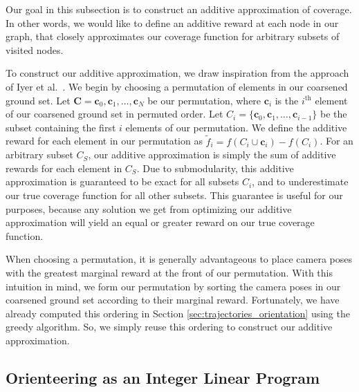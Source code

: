 Our goal in this subsection is to construct an additive approximation of coverage.
In other words, we would like to define an additive reward at each node in our graph, that closely approximates our coverage function for arbitrary subsets of visited nodes.

To construct our additive approximation, we draw inspiration from the approach of Iyer et al.~\cite{iyer:2013b,iyer:2013a}.
We begin by choosing a permutation of elements in our coarsened ground set.
Let $\mathbf{C} = \mathbf{c}_0, \mathbf{c}_1, \ldots, \mathbf{c}_N$ be our permutation, where $\mathbf{c}_i$ is the $i^{\text{th}}$ element of our coarsened ground set in permuted order.
Let $C_i = \{ \mathbf{c}_0, \mathbf{c}_1, \ldots, \mathbf{c}_{i-1} \}$ be the subset containing the first $i$ elements of our permutation.
We define the additive reward for each element in our permutation as $\tilde{f}_i = f(C_i \cup \mathbf{c}_i) - f(C_i)$.
For an arbitrary subset $C_S$, our additive approximation is simply the sum of additive rewards for each element in $C_S$. Due to submodularity, this additive approximation is guaranteed to be exact for all subsets $C_i$, and to underestimate our true coverage function for all other subsets.
This guarantee is useful for our purposes, because any solution we get from optimizing our additive approximation will yield an equal or greater reward on our true coverage function.

When choosing a permutation, it is generally advantageous to place camera poses with the greatest marginal reward at the front of our permutation.
With this intuition in mind, we form our permutation by sorting the camera poses in our coarsened ground set according to their marginal reward.
Fortunately, we have already computed this ordering in Section \ref{sec:trajectories_orientation} using the greedy algorithm.
So, we simply reuse this ordering to construct our additive approximation.

\subsection{Orienteering as an Integer Linear Program}
\label{sec:trajectories_ilp}

